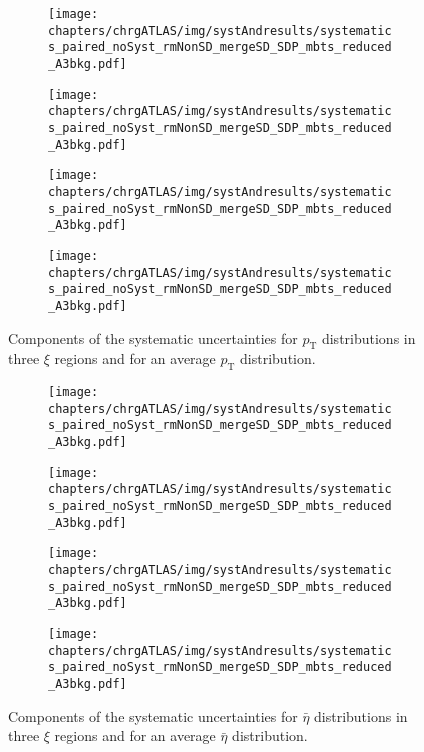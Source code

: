 \begin{figure}[h!]
	\vspace{-2.5cm}
	\centering
	\begin{subfigure}{.49\textwidth}
		\texttt{[image: chapters/chrgATLAS/img/systAndresults/systematics\_paired\_noSyst\_rmNonSD\_mergeSD\_SDP\_mbts\_reduced\_A3bkg.pdf]}
	\end{subfigure}
	\begin{subfigure}{.49\textwidth}
		\texttt{[image: chapters/chrgATLAS/img/systAndresults/systematics\_paired\_noSyst\_rmNonSD\_mergeSD\_SDP\_mbts\_reduced\_A3bkg.pdf]}
	\end{subfigure}
		\begin{subfigure}{.49\textwidth}
			\texttt{[image: chapters/chrgATLAS/img/systAndresults/systematics\_paired\_noSyst\_rmNonSD\_mergeSD\_SDP\_mbts\_reduced\_A3bkg.pdf]}
		\end{subfigure}
	\begin{subfigure}{.49\textwidth}
		\texttt{[image: chapters/chrgATLAS/img/systAndresults/systematics\_paired\_noSyst\_rmNonSD\_mergeSD\_SDP\_mbts\_reduced\_A3bkg.pdf]}
	\end{subfigure}
		\caption{Components of the systematic uncertainties for $p_\textrm{T}$ distributions in three $\xi$ regions and for an average $p_\textrm{T}$ distribution.}
		\label{fig:results_atlas_pt_syst_sd}
		\vspace{-1.5cm}
\end{figure}
\begin{figure}[h!]
	\centering
	\begin{subfigure}{.49\textwidth}
		\texttt{[image: chapters/chrgATLAS/img/systAndresults/systematics\_paired\_noSyst\_rmNonSD\_mergeSD\_SDP\_mbts\_reduced\_A3bkg.pdf]}
	\end{subfigure}
	\begin{subfigure}{.49\textwidth}
		\texttt{[image: chapters/chrgATLAS/img/systAndresults/systematics\_paired\_noSyst\_rmNonSD\_mergeSD\_SDP\_mbts\_reduced\_A3bkg.pdf]}
	\end{subfigure}
	\begin{subfigure}{.49\textwidth}
		\texttt{[image: chapters/chrgATLAS/img/systAndresults/systematics\_paired\_noSyst\_rmNonSD\_mergeSD\_SDP\_mbts\_reduced\_A3bkg.pdf]}
	\end{subfigure}
	\begin{subfigure}{.49\textwidth}
		\texttt{[image: chapters/chrgATLAS/img/systAndresults/systematics\_paired\_noSyst\_rmNonSD\_mergeSD\_SDP\_mbts\_reduced\_A3bkg.pdf]}
	\end{subfigure}
		\caption{Components of the systematic uncertainties for $\bar{\eta}$ distributions in three $\xi$ regions and for an average $\bar{\eta}$ distribution.}
		\label{fig:results_atlas_eta_syst_sd}
		\vspace{-2.5cm}
\end{figure}
